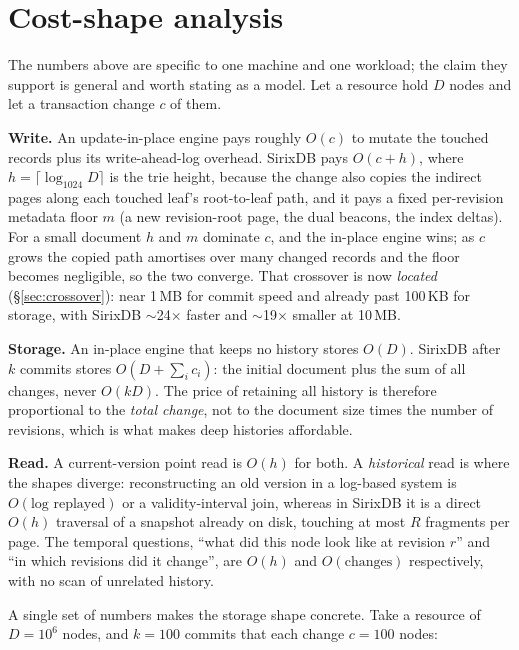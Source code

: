 \documentclass[11pt,a4paper,oneside]{report}
\theoremstyle{sirixthm}
\begin{document}
\section{Cost-shape analysis}

The numbers above are specific to one machine and one workload; the claim they support is general and
worth stating as a model. Let a resource hold $D$ nodes and let a transaction change $c$ of them.

\textbf{Write.} An update-in-place engine pays roughly $O(c)$ to mutate the touched records plus its
write-ahead-log overhead. SirixDB pays $O(c + h)$, where $h = \lceil\log_{1024} D\rceil$ is the trie
height, because the change also copies the indirect pages along each touched leaf's root-to-leaf path,
and it pays a fixed per-revision metadata floor $m$ (a new revision-root page, the dual beacons, the
index deltas). For a small document $h$ and $m$ dominate $c$, and the in-place engine wins; as $c$ grows
the copied path amortises over many changed records and the floor becomes negligible, so the two
converge. That crossover is now \emph{located} (\S\ref{sec:crossover}): near 1\,MB for commit speed and
already past 100\,KB for storage, with SirixDB $\sim$24$\times$ faster and $\sim$19$\times$ smaller at
10\,MB.

\textbf{Storage.} An in-place engine that keeps no history stores $O(D)$. SirixDB after $k$ commits
stores $O(D + \sum_i c_i)$: the initial document plus the sum of all changes, never $O(kD)$. The price
of retaining all history is therefore proportional to the \emph{total change}, not to the document size
times the number of revisions, which is what makes deep histories affordable.

\textbf{Read.} A current-version point read is $O(h)$ for both. A \emph{historical} read is where the
shapes diverge: reconstructing an old version in a log-based system is $O(\text{log replayed})$ or a
validity-interval join, whereas in SirixDB it is a direct $O(h)$ traversal of a snapshot already on
disk, touching at most $R$ fragments per page. The temporal questions, ``what did this node look like at
revision $r$'' and ``in which revisions did it change'', are $O(h)$ and $O(\text{changes})$
respectively, with no scan of unrelated history.

A single set of numbers makes the storage shape concrete. Take a resource of $D=10^{6}$ nodes, and
$k=100$ commits that each change $c=100$ nodes:
\end{document}
